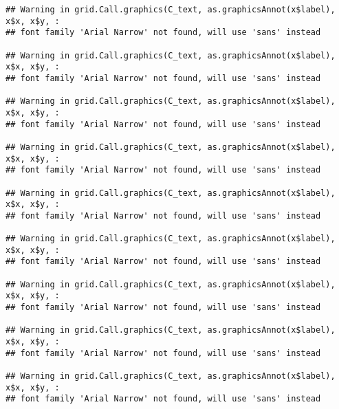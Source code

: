 \documentclass[
]{article}
\begin{document}
\begin{verbatim}
## Warning in grid.Call.graphics(C_text, as.graphicsAnnot(x$label), x$x, x$y, :
## font family 'Arial Narrow' not found, will use 'sans' instead

## Warning in grid.Call.graphics(C_text, as.graphicsAnnot(x$label), x$x, x$y, :
## font family 'Arial Narrow' not found, will use 'sans' instead

## Warning in grid.Call.graphics(C_text, as.graphicsAnnot(x$label), x$x, x$y, :
## font family 'Arial Narrow' not found, will use 'sans' instead

## Warning in grid.Call.graphics(C_text, as.graphicsAnnot(x$label), x$x, x$y, :
## font family 'Arial Narrow' not found, will use 'sans' instead

## Warning in grid.Call.graphics(C_text, as.graphicsAnnot(x$label), x$x, x$y, :
## font family 'Arial Narrow' not found, will use 'sans' instead

## Warning in grid.Call.graphics(C_text, as.graphicsAnnot(x$label), x$x, x$y, :
## font family 'Arial Narrow' not found, will use 'sans' instead

## Warning in grid.Call.graphics(C_text, as.graphicsAnnot(x$label), x$x, x$y, :
## font family 'Arial Narrow' not found, will use 'sans' instead

## Warning in grid.Call.graphics(C_text, as.graphicsAnnot(x$label), x$x, x$y, :
## font family 'Arial Narrow' not found, will use 'sans' instead

## Warning in grid.Call.graphics(C_text, as.graphicsAnnot(x$label), x$x, x$y, :
## font family 'Arial Narrow' not found, will use 'sans' instead
\end{verbatim}
\end{document}
